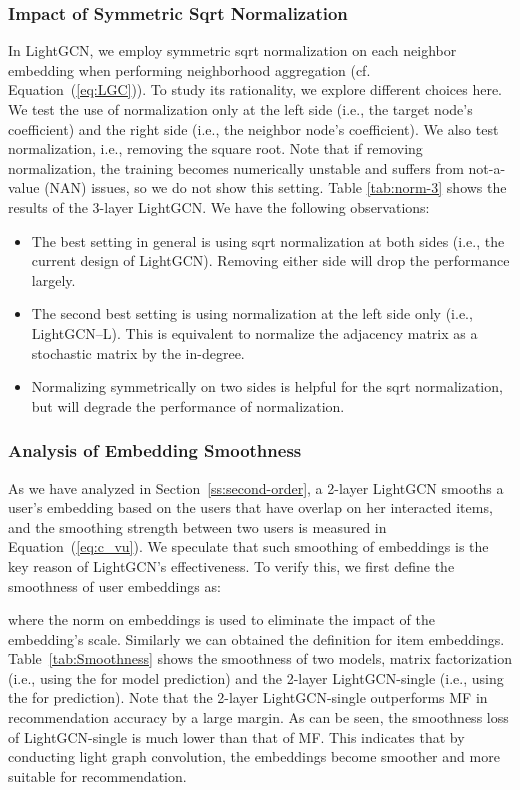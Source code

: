 \documentclass[sigconf]{acmart}
\theoremstyle{definition}
\begin{document}
\subsubsection{Impact of Symmetric Sqrt Normalization}\label{ss:ablation-symmetric}
In LightGCN, we employ symmetric sqrt normalization  on each neighbor embedding when performing neighborhood aggregation (cf. Equation~(\ref{eq:LGC})). To study its rationality, we explore different choices here. We test the use of normalization only at the left side (i.e., the target node's coefficient) and the right side (i.e., the neighbor node's coefficient). 
We also test  normalization, i.e.,  removing the square root. 
Note that if removing normalization, the training becomes numerically unstable and suffers from not-a-value (NAN) issues, so we do not show this setting. 
Table \ref{tab:norm-3} shows the results of the 3-layer LightGCN. We have the following observations:
\begin{itemize}[leftmargin=*]
    \item The best setting in general is using sqrt normalization at both sides (i.e., the current design of LightGCN). Removing either side will drop the performance largely.
    \item The second best setting is using  normalization at the left side only (i.e., LightGCN--L). This is equivalent to normalize the adjacency matrix as a stochastic matrix by the in-degree. 
    \item Normalizing symmetrically on two sides is helpful for the sqrt normalization, but will degrade the performance of  normalization. 
\end{itemize}

\subsubsection{Analysis of Embedding Smoothness} 
As we have analyzed in Section~\ref{ss:second-order}, a 2-layer LightGCN smooths a user's embedding based on the users that have overlap on her interacted items, and the smoothing strength between two users  is measured in Equation~(\ref{eq:c_vu}). We speculate that such smoothing of embeddings is the key reason of LightGCN's effectiveness. To verify this, we first define the smoothness of user embeddings as:

where the  norm on embeddings is used to eliminate the impact of the embedding's scale. Similarly we can obtained the definition for item embeddings. 
Table~\ref{tab:Smoothness} shows the smoothness of two models, matrix factorization (i.e., using the  for model prediction) and the 2-layer LightGCN-single (i.e., using the  for prediction). 
Note that the 2-layer LightGCN-single outperforms MF in recommendation accuracy by a large margin. As can be seen, the smoothness loss of LightGCN-single is much lower than that of MF. This indicates that by conducting light graph convolution, the embeddings become smoother and more suitable for recommendation. 
\end{document}
